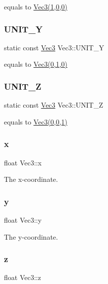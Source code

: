 equals to \hyperlink{classVec3}{Vec3(1,0,0)} \mbox{\label{classVec3_a0d569defe7293f1cb108f643230facf5}} 
\subsubsection{\texorpdfstring{U\+N\+I\+T\+\_\+Y}{UNIT\_Y}}
{\footnotesize\ttfamily static const \hyperlink{classVec3}{Vec3} Vec3\+::\+U\+N\+I\+T\+\_\+Y\hspace{0.3cm}{\ttfamily [static]}}

equals to \hyperlink{classVec3}{Vec3(0,1,0)} \mbox{\label{classVec3_a4dc6ac738e447c3f67b10d0ab5c3708b}} 
\subsubsection{\texorpdfstring{U\+N\+I\+T\+\_\+Z}{UNIT\_Z}}
{\footnotesize\ttfamily static const \hyperlink{classVec3}{Vec3} Vec3\+::\+U\+N\+I\+T\+\_\+Z\hspace{0.3cm}{\ttfamily [static]}}

equals to \hyperlink{classVec3}{Vec3(0,0,1)} \mbox{\label{classVec3_a2814580e9b9372738c0a61197ea46b51}} 
\subsubsection{\texorpdfstring{x}{x}}
{\footnotesize\ttfamily float Vec3\+::x}

The x-\/coordinate. \mbox{\label{classVec3_abc1d241232cb04aa98217a942402ae68}} 
\subsubsection{\texorpdfstring{y}{y}}
{\footnotesize\ttfamily float Vec3\+::y}

The y-\/coordinate. \mbox{\label{classVec3_a64f3f00cd2dd9076999eeb2f05210388}} 
\subsubsection{\texorpdfstring{z}{z}}
{\footnotesize\ttfamily float Vec3\+::z}

